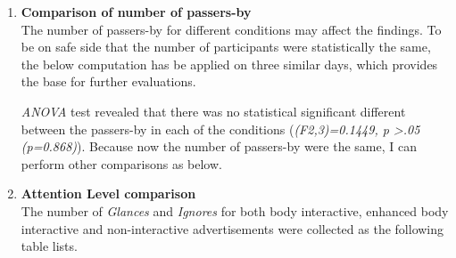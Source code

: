 \begin{enumerate}
\item \textbf{Comparison of number of passers-by} \\
The number of passers-by for different conditions may affect the findings. To be on safe side that the number of participants were statistically the same, the below computation has be applied on three similar days, which provides the base for further evaluations.


\begin{table}[H]
\caption{Number of people for three conditions}
\label{tab:newbodypasserbyofthreeweeks}
\centering
{}
\end{table}

\emph{ANOVA} test revealed that there was no statistical significant different between the passers-by in each of the conditions (\emph{(F2,3)=0.1449, p >.05 (p=0.868)}). Because now the number of passers-by were the same, I can perform other comparisons as below.


\item \textbf{Attention Level comparison}  \\
The number of \emph{Glances} and \emph{Ignores} for both body interactive, enhanced body interactive and non-interactive advertisements were collected as the following table lists.

\begin{table}[H]
\caption{Cross tabulation for each condition attention level}
\label{tab:newbodycrosstabulationweeks}
\centering
{}
\end{table}



\end{enumerate}
